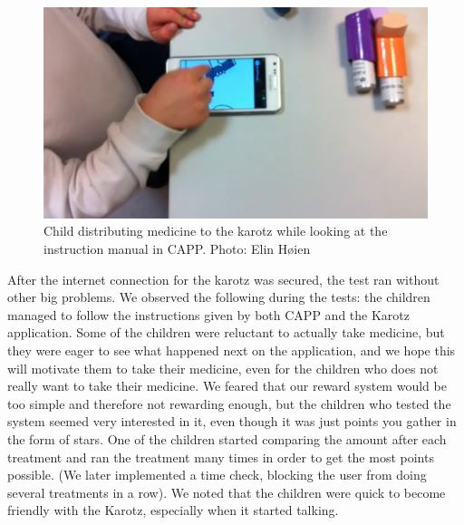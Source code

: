 \begin{figure}
	\centering
		\includegraphics[width=0.4\paperheight, angle=90]{Pictures/usabilitytestinstructions}
	\caption[Usability test CAPP instructions]{Child distributing medicine to the karotz while looking at the instruction manual in CAPP. Photo: Elin Høien}
	\label{fig:cappinstructions}
\end{figure}

After the internet connection for the karotz was secured, the test ran without other big problems. We observed the following during the tests: the children
managed to follow the instructions given by both CAPP and the Karotz application. Some of the children were reluctant to actually take medicine, but they were eager to see what happened
next on the application, and we hope this will motivate them to take their medicine, even for the children who does not really want to take their medicine. We feared that our reward system would be too simple and
therefore not rewarding enough, but the children who tested the system seemed very interested in it, even though it was just points you gather in the form of stars. One of the children started comparing the amount after each treatment and ran the treatment many times in order to get the most
points possible. (We later implemented a time check, blocking the user from doing several treatments in a row).
We noted that the children were quick to become friendly with the Karotz, especially when it started talking.

